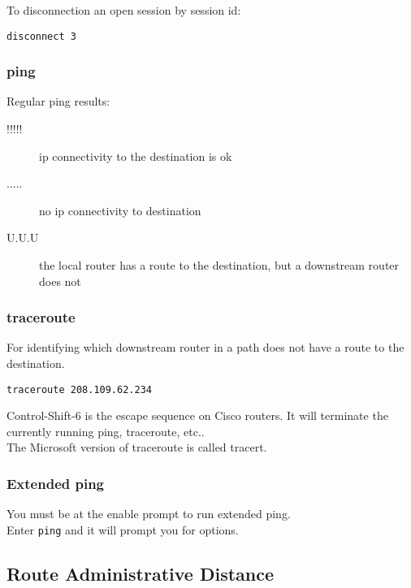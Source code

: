 To disconnection an open session by session id:

\begin{verbatim}
disconnect 3
\end{verbatim}

\subsubsection{ping}

Regular ping results:

\begin{description}

\item[!!!!!]
ip connectivity to the destination is ok

\item[.....]
no ip connectivity to destination

\item[U.U.U]
the local router has a route to the destination, but a downstream router does
not

\end{description}

\subsubsection{traceroute}

For identifying which downstream router in a path does not have a route to
the destination.

\begin{verbatim}
traceroute 208.109.62.234
\end{verbatim}

Control-Shift-6 is the escape sequence on Cisco routers. It will terminate
the currently running ping, traceroute, etc..\\

The Microsoft version of traceroute is called tracert.

\subsubsection{Extended ping}

You must be at the enable prompt to run extended ping.\\

Enter \texttt{ping} and it will prompt you for options.

\subsection{Route Administrative Distance}

